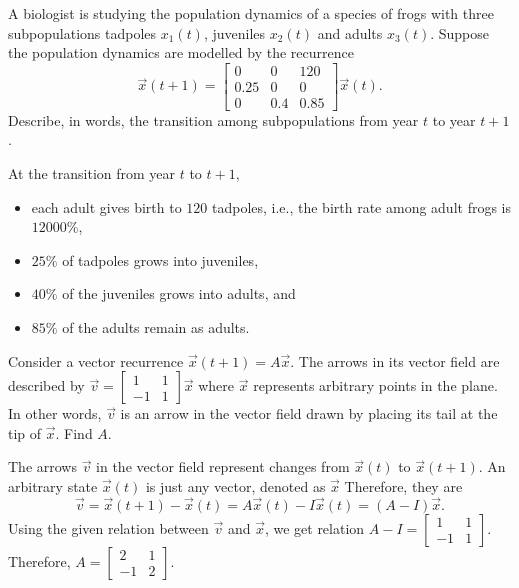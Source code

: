 \documentclass[../main.tex]{subfiles}
\begin{document}
\begin{exercise}
  A biologist is studying the population dynamics of a species of frogs with three subpopulations tadpoles \(x_{1}(t)\), juveniles \(x_{2}(t)\) and adults \(x_{3}(t)\). Suppose the population dynamics are modelled by the recurrence
  \[
    \vec{x}(t+1) =
    \begin{bmatrix}
      0 & 0 & 120 \\
      0.25 & 0 & 0 \\
      0 & 0.4 & 0.85
    \end{bmatrix}
    \vec{x}(t).
  \]
  Describe, in words, the transition among subpopulations from year \(t\) to year \(t + 1\).

  \begin{solution}
    At the transition from year \(t\) to \(t+1\),
    \begin{itemize}
      \item each adult gives birth to \(120\) tadpoles, i.e., the birth rate among adult frogs is \(12000\%\),
      \item \(25\%\) of tadpoles grows into juveniles, 
      \item \(40\%\) of the juveniles grows into adults, and
      \item \(85\%\) of the adults remain as adults.
    \end{itemize}
  \end{solution}
\end{exercise}

\begin{exercise}
  Consider a vector recurrence \(\vec{x}(t+1) = A \vec{x}\).  The arrows in its vector field are described by \(\vec{v} = \begin{bmatrix} 1 & 1 \\ -1 & 1 \end{bmatrix}\vec{x}\) where \(\vec{x}\) represents arbitrary points in the plane. In other words, \(\vec{v}\) is an arrow in the vector field drawn by placing its tail at the tip of \(\vec{x}\). Find \(A\).

  \begin{solution}
    The arrows \(\vec{v}\) in the vector field represent changes from \(\vec{x}(t)\) to \(\vec{x}(t+1)\). An arbitrary state \(\vec{x}(t)\) is just any vector, denoted as \(\vec{x}\) Therefore, they are
    \[
      \vec{v} = \vec{x}(t+1) - \vec{x}(t) = A \vec{x}(t) - I \vec{x}(t) = (A - I) \vec{x}.
    \]
    Using the given relation between \(\vec{v}\) and \(\vec{x}\), we get relation
    \( A - I = \begin{bmatrix} 1 & 1 \\ -1 & 1 \end{bmatrix} \). Therefore, \(A = \begin{bmatrix} 2 & 1 \\ -1 & 2 \end{bmatrix}\).
  \end{solution}
\end{exercise}
\end{document}
